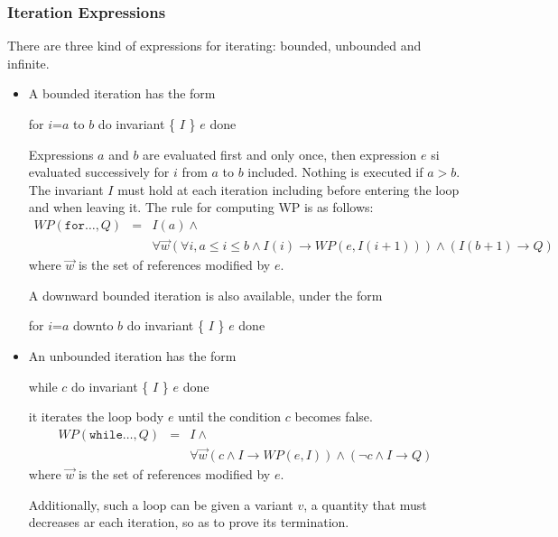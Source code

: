 
\subsubsection{Iteration Expressions}

There are three kind of expressions for iterating: bounded, unbounded and infinite.

\begin{itemize}
\item A bounded iteration has the form
\begin{flushleft}\ttfamily
  for $i$=$a$ to $b$ do invariant \{ $I$ \} $e$ done
\end{flushleft}
Expressions $a$ and $b$ are evaluated first and only once, then expression $e$ si evaluated successively for $i$ from $a$ to $b$ included. Nothing is executed if $a > b$. The invariant $I$ must hold at each iteration including before entering the loop and when leaving it. The rule for computing WP is as follows:
\begin{eqnarray*}
  WP(\texttt{for} \ldots, Q) &=& I(a) \land \\
&& \forall \vec{w} (\forall i, a \leq i \leq b \land I(i) \rightarrow WP(e,I(i+1))) \land (I(b+1) \rightarrow Q)
\end{eqnarray*}
where $\vec{w}$ is the set of references modified by $e$.

A downward bounded iteration is also available, under the form
\begin{flushleft}\ttfamily
  for $i$=$a$ downto $b$ do invariant \{ $I$ \} $e$ done
\end{flushleft}

\item An unbounded iteration has the form
\begin{flushleft}\ttfamily
  while $c$ do invariant \{ $I$ \} $e$ done
\end{flushleft}
it iterates the loop body $e$ until the condition $c$ becomes false. 
\begin{eqnarray*}
  WP(\texttt{while} \ldots, Q) &=& I \land \\
&& \forall \vec{w} (c \land I \rightarrow WP(e,I)) \land (\neg c \land I \rightarrow Q)
\end{eqnarray*}
where $\vec{w}$ is the set of references modified by $e$.

Additionally, such a loop can be given a variant $v$, a quantity that must decreases ar each iteration, so as to prove its termination.



\end{itemize}
